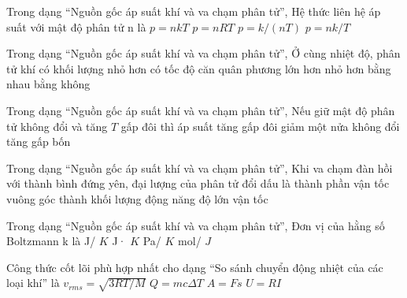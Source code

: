 \begin{ex}
Trong dạng “Nguồn gốc áp suất khí và va chạm phân tử”, Hệ thức liên hệ áp suất với mật độ phân tử n là
\choice
{\True $p=nkT$}
{$p=nRT$}
{$p=k/(nT)$}
{$p=nk/T$}
\end{ex}

\begin{ex}
Trong dạng “Nguồn gốc áp suất khí và va chạm phân tử”, Ở cùng nhiệt độ, phân tử khí có khối lượng nhỏ hơn có tốc độ căn quân phương
\choice
{\True lớn hơn}
{nhỏ hơn}
{bằng nhau}
{bằng không}
\end{ex}

\begin{ex}
Trong dạng “Nguồn gốc áp suất khí và va chạm phân tử”, Nếu giữ mật độ phân tử không đổi và tăng $T$ gấp đôi thì áp suất
\choice
{\True tăng gấp đôi}
{giảm một nửa}
{không đổi}
{tăng gấp bốn}
\end{ex}

\begin{ex}
Trong dạng “Nguồn gốc áp suất khí và va chạm phân tử”, Khi va chạm đàn hồi với thành bình đứng yên, đại lượng của phân tử đổi dấu là
\choice
{\True thành phần vận tốc vuông góc thành}
{khối lượng}
{động năng}
{độ lớn vận tốc}
\end{ex}

\begin{ex}
Trong dạng “Nguồn gốc áp suất khí và va chạm phân tử”, Đơn vị của hằng số Boltzmann k là
\choice
{\True J/ $K$}
{J· $K$}
{Pa/ $K$}
{mol/ $J$}
\end{ex}

\begin{ex}
Công thức cốt lõi phù hợp nhất cho dạng “So sánh chuyển động nhiệt của các loại khí” là
\choice
{\True $v_{rms}=\sqrt{3RT/M}$}
{$Q=mc\Delta T$}
{$A=Fs$}
{$U=RI$}
\end{ex}

